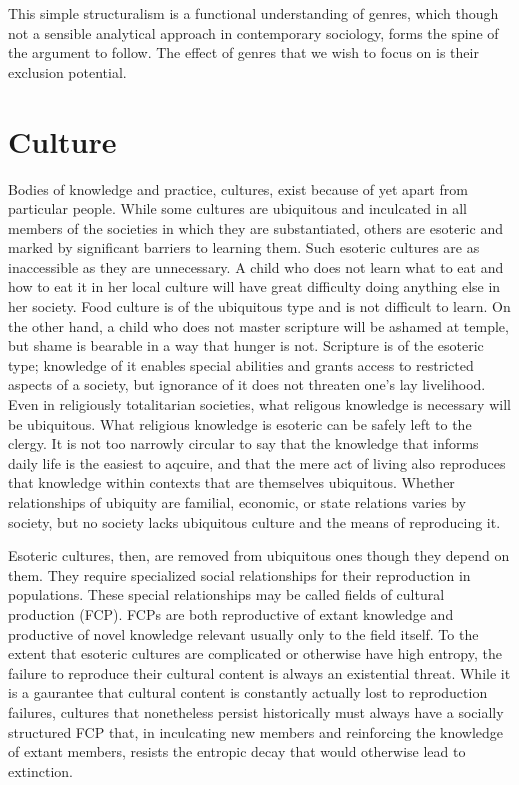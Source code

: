 \documentclass[]{book}
\theoremstyle{definition}
\theoremstyle{definition}
\theoremstyle{definition}
\theoremstyle{remark}
\begin{document}
This simple structuralism is a functional understanding of genres, which
though not a sensible analytical approach in contemporary sociology,
forms the spine of the argument to follow. The effect of genres that we
wish to focus on is their exclusion potential.

\hypertarget{culture}{%
\section{Culture}\label{culture}}

Bodies of knowledge and practice, cultures, exist because of yet apart
from particular people. While some cultures are ubiquitous and
inculcated in all members of the societies in which they are
substantiated, others are esoteric and marked by significant barriers to
learning them. Such esoteric cultures are as inaccessible as they are
unnecessary. A child who does not learn what to eat and how to eat it in
her local culture will have great difficulty doing anything else in her
society. Food culture is of the ubiquitous type and is not difficult to
learn. On the other hand, a child who does not master scripture will be
ashamed at temple, but shame is bearable in a way that hunger is not.
Scripture is of the esoteric type; knowledge of it enables special
abilities and grants access to restricted aspects of a society, but
ignorance of it does not threaten one's lay livelihood. Even in
religiously totalitarian societies, what religous knowledge is necessary
will be ubiquitous. What religious knowledge is esoteric can be safely
left to the clergy. It is not too narrowly circular to say that the
knowledge that informs daily life is the easiest to aqcuire, and that
the mere act of living also reproduces that knowledge within contexts
that are themselves ubiquitous. Whether relationships of ubiquity are
familial, economic, or state relations varies by society, but no society
lacks ubiquitous culture and the means of reproducing it.

Esoteric cultures, then, are removed from ubiquitous ones though they
depend on them. They require specialized social relationships for their
reproduction in populations. These special relationships may be called
fields of cultural production (FCP). FCPs are both reproductive of
extant knowledge and productive of novel knowledge relevant usually only
to the field itself. To the extent that esoteric cultures are
complicated or otherwise have high entropy, the failure to reproduce
their cultural content is always an existential threat. While it is a
gaurantee that cultural content is constantly actually lost to
reproduction failures, cultures that nonetheless persist historically
must always have a socially structured FCP that, in inculcating new
members and reinforcing the knowledge of extant members, resists the
entropic decay that would otherwise lead to extinction.
\end{document}

